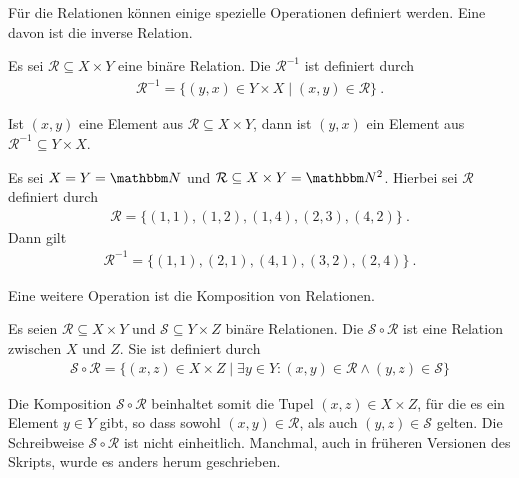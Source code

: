 \begin{Unit}
Für die Relationen können einige spezielle Operationen definiert werden. Eine
davon ist die inverse Relation.

\begin{Definition}
  Es sei $\mathcal{R} \subseteq X \times Y$ eine binäre Relation.
  Die 
  $\mathcal{R}^{-1}$ ist definiert durch
  \begin{align}
    \mathcal{R}^{-1} = \{ (y,x) \in Y \times X \mid (x,y) \in \mathcal{R} \} 
    \ .
  \end{align}
\end{Definition}

Ist $(x,y)$ eine Element aus $\mathcal{R} \subseteq X \times Y$, dann ist 
$(y,x)$ ein Element aus $\mathcal{R}^{-1} \subseteq Y \times X$.
\end{Unit}

\begin{Unit}
  Es sei $X = Y = \NN$ und $\mathcal{R} \subseteq X \times Y = \NN^2$. 
  Hierbei   sei $\mathcal{R}$ definiert durch
  \begin{align}
    \mathcal{R} = \{ (1,1), (1,2), (1,4), (2,3), (4,2)\} \ . 
  \end{align}
  Dann gilt
  \begin{align}
    \mathcal{R}^{-1} = \{ (1,1), (2,1), (4,1), (3,2), (2,4)\} \ . 
  \end{align}
\end{Unit}

\begin{Unit}
Eine weitere Operation ist die Komposition von Relationen.

\begin{Definition}
  Es seien $\mathcal{R} \subseteq X \times Y$ und $\mathcal{S} \subseteq Y 
  \times Z$ binäre Relationen. Die  $\mathcal{S} \circ 
  \mathcal{R}$ ist eine Relation zwischen $X$ und $Z$. Sie ist definiert 
  durch
  \begin{align}
    \mathcal{S} \circ \mathcal{R} = \{ (x,z) \in X \times Z \mid \exists y 
    \in Y : (x,y) \in \mathcal{R} \land (y,z) \in \mathcal{S} \} 
  \end{align}
\end{Definition}

Die Komposition $\mathcal{S} \circ \mathcal{R}$ beinhaltet somit die Tupel 
$(x,z) \in X \times Z$, für die es ein Element $y \in Y$ gibt, so dass sowohl 
$(x,y) \in \mathcal{R}$, als auch $(y,z) \in \mathcal{S}$ gelten. Die 
Schreibweise $\mathcal{S} \circ \mathcal{R}$ ist nicht einheitlich. Manchmal,
auch in früheren Versionen des Skripts, wurde es anders herum geschrieben.
\end{Unit}

